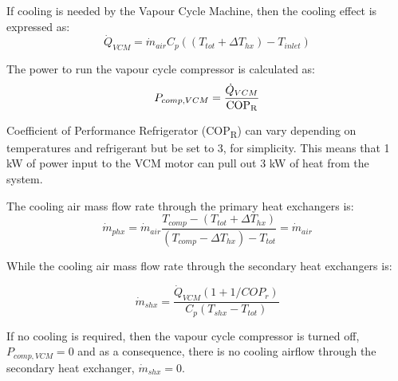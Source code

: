 \documentclass[english]{kththesis}
\begin{document}

If cooling is needed by the Vapour Cycle Machine, then the cooling effect is expressed as:
\begin{equation}
\label{VCMQ}
\dot{Q}_{VCM} = \dot{m}_{air}C_p((T_{tot}+\Delta T_{hx})-T_{inlet})
\end{equation}

The power to run the vapour cycle compressor is calculated as:
\begin{equation}
\label{VCMPref}
P_{comp,VCM} = \frac{\dot{Q}_{VCM}}{\text{COP\textsubscript{R}}}
\end{equation}

Coefficient of Performance Refrigerator (COP\textsubscript{R}) can vary depending on temperatures and refrigerant but be set to 3, for simplicity. This means that 1 kW of power input to the VCM motor can pull out 3 kW of heat from the system.


The cooling air mass flow rate through the primary heat exchangers is:
\begin{equation}
\label{VCMphx}
\dot{m}_{phx} = \dot{m}_{air}\frac{T_{comp}-(T_{tot}+\Delta T_{hx})}{(T_{comp}-\Delta T_{hx})-T_{tot}} = \dot{m}_{air}
\end{equation}

While the cooling air mass flow rate through the secondary heat exchangers is:

\begin{equation}
\label{VCMshx}
\dot{m}_{shx} = \frac{\dot{Q}_{VCM}(1+1/COP_r)}{C_p (T_{shx}-T_{tot})}
\end{equation}



If no cooling is required, then the vapour cycle compressor is turned off, $P_{comp,VCM}=0$ and as a consequence, there is no cooling airflow through the secondary heat exchanger, $\dot{m}_{shx}=0$.
\end{document}
